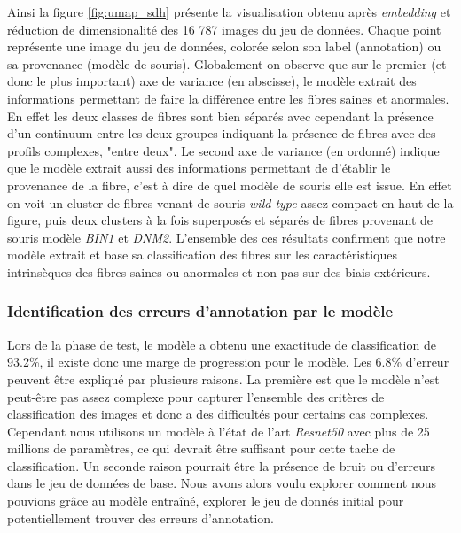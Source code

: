Ainsi la figure \ref{fig:umap_sdh} présente la visualisation obtenu après \textit{embedding} et réduction de dimensionalité des 16 787 images du jeu de données. Chaque point représente une image du jeu de données, colorée selon son label (annotation) ou sa provenance (modèle de souris). Globalement on observe que sur le premier (et donc le plus important) axe de variance (en abscisse), le modèle extrait des informations permettant de faire la différence entre les fibres saines et anormales. En effet les deux classes de fibres sont bien séparés avec cependant la présence d'un continuum entre les deux groupes indiquant la présence de fibres avec des profils complexes, "entre deux". Le second axe de variance (en ordonné) indique que le modèle extrait aussi des informations permettant de d'établir le provenance de la fibre, c'est à dire de quel modèle de souris elle est issue. En effet on voit un cluster de fibres venant de souris \textit{wild-type} assez compact en haut de la figure, puis deux clusters à la fois superposés et séparés de fibres provenant de souris modèle \textit{BIN1} et \textit{DNM2}. L'ensemble des ces résultats confirment que notre modèle extrait et base sa classification des fibres sur les caractéristiques intrinsèques des fibres saines ou anormales et non pas sur des biais extérieurs.

\subsubsection{Identification des erreurs d'annotation par le modèle}
Lors de la phase de test, le modèle a obtenu une exactitude de classification de 93.2\%, il existe donc une marge de progression pour le modèle. Les 6.8\% d'erreur peuvent être expliqué par plusieurs raisons. La première est que le modèle n'est peut-être pas assez complexe pour capturer l'ensemble des critères de classification des images et donc a des difficultés pour certains cas complexes. Cependant nous utilisons un modèle à l'état de l'art \textit{Resnet50} avec plus de 25 millions de paramètres, ce qui devrait être suffisant pour cette tache de classification. Un seconde raison pourrait être la présence de bruit ou d'erreurs dans le jeu de données de base. Nous avons alors voulu explorer comment nous pouvions grâce au modèle entraîné, explorer le jeu de donnés initial pour potentiellement trouver des erreurs d'annotation.

